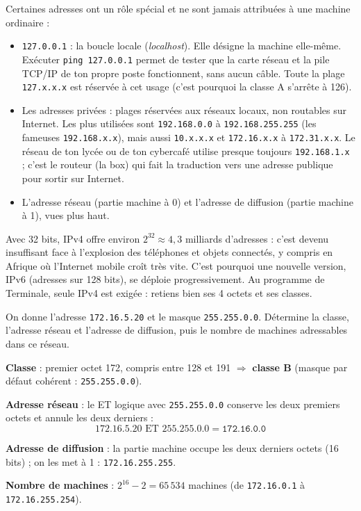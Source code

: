 \documentclass[11pt]{article}
\newcommand{\cle}[1]{{\popxbold\color{popdark}#1}}
\newcounter{popsec}
\newcounter{popsub}
\newcommand{\courssub}[1]{%
  \stepcounter{popsub}%
  \par\vspace{9pt}\noindent{\popxbold\fontsize{11.5}{13}\selectfont\color{popink}{\color{poporange}\thepopsec.\thepopsub}\hspace{6pt}#1}\par\nopagebreak\vspace{4pt}
}
\begin{document}
\courssub{Adresses particulières à connaître}

Certaines adresses ont un rôle spécial et ne sont jamais attribuées à une machine ordinaire :

\begin{itemize}
  \item \texttt{127.0.0.1} : la \cle{boucle locale} (\emph{localhost}). Elle désigne la machine elle-même. Exécuter \texttt{ping 127.0.0.1} permet de tester que la carte réseau et la pile TCP/IP de ton propre poste fonctionnent, sans aucun câble. Toute la plage \texttt{127.x.x.x} est réservée à cet usage (c'est pourquoi la classe A s'arrête à 126).
  \item Les \cle{adresses privées} : plages réservées aux réseaux locaux, non routables sur Internet. Les plus utilisées sont \texttt{192.168.0.0} à \texttt{192.168.255.255} (les fameuses \texttt{192.168.x.x}), mais aussi \texttt{10.x.x.x} et \texttt{172.16.x.x} à \texttt{172.31.x.x}. Le réseau de ton lycée ou de ton cybercafé utilise presque toujours \texttt{192.168.1.x} ; c'est le routeur (la box) qui fait la traduction vers une adresse publique pour sortir sur Internet.
  \item L'adresse réseau (partie machine à 0) et l'adresse de diffusion (partie machine à 1), vues plus haut.
\end{itemize}

\begin{savaistu}
Avec 32 bits, IPv4 offre environ $2^{32} \approx 4,3$ milliards d'adresses : c'est devenu insuffisant face à l'explosion des téléphones et objets connectés, y compris en Afrique où l'Internet mobile croît très vite. C'est pourquoi une nouvelle version, \cle{IPv6} (adresses sur 128 bits), se déploie progressivement. Au programme de Terminale, seule IPv4 est exigée : retiens bien ses 4 octets et ses classes.
\end{savaistu}

\begin{exercice}
On donne l'adresse \texttt{172.16.5.20} et le masque \texttt{255.255.0.0}. Détermine la classe, l'adresse réseau et l'adresse de diffusion, puis le nombre de machines adressables dans ce réseau.
\end{exercice}

\begin{corrige}[Exercice]
\textbf{Classe} : premier octet 172, compris entre 128 et 191 $\Rightarrow$ \textbf{classe B} (masque par défaut cohérent : \texttt{255.255.0.0}).

\textbf{Adresse réseau} : le ET logique avec \texttt{255.255.0.0} conserve les deux premiers octets et annule les deux derniers :
\[ 172.16.5.20 \text{ ET } 255.255.0.0 = \texttt{172.16.0.0} \]

\textbf{Adresse de diffusion} : la partie machine occupe les deux derniers octets (16 bits) ; on les met à 1 : \texttt{172.16.255.255}.

\textbf{Nombre de machines} : $2^{16} - 2 = 65\,534$ machines (de \texttt{172.16.0.1} à \texttt{172.16.255.254}).
\end{corrige}
\end{document}
